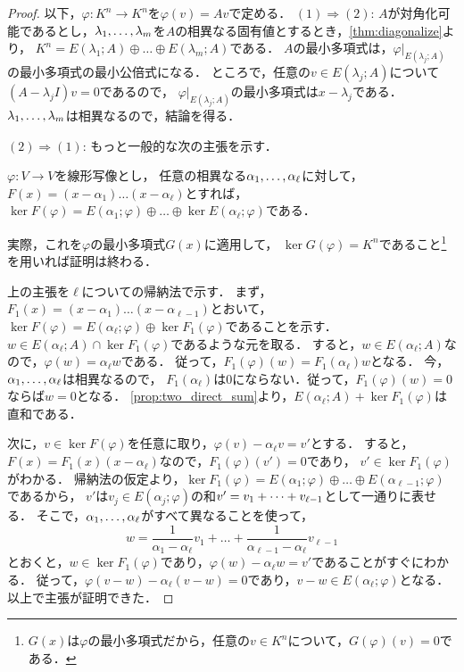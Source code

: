 \begin{proof}
 以下，$\varphi \colon K^n \to K^n$を$\varphi(v)=Av$で定める．
$(1) \Rightarrow (2)$:
$A$が対角化可能であるとし，$\idxdot{\lambda}{1}{m}$を$A$の相異なる固有値とするとき，\cref{thm:diagonalize}より，
$K^n = E(\lambda_1;A) \oplus \dots \oplus E(\lambda_m;A)$である．
$A$の最小多項式は，$\varphi|_{E(\lambda_j;A)}$の最小多項式の最小公倍式になる．
ところで，任意の$v \in E(\lambda_j;A)$について$(A-\lambda_j I)v = 0$であるので，
$\varphi|_{E(\lambda_j;A)}$の最小多項式は$x-\lambda_j$である．
$\idxdot{\lambda}{1}{m}$は相異なるので，結論を得る．

$(2) \Rightarrow (1)$:
もっと一般的な次の主張を示す．
\begin{claim}
    $\varphi\colon V \to V$を線形写像とし，
    任意の相異なる$\idxdot{\alpha}{1}{\ell}$に対して，
    $F(x)=(x-\alpha_1)\dots(x-\alpha_\ell)$とすれば，
    $\ker F(\varphi) = E(\alpha_1;\varphi) \oplus \dots \oplus \ker E(\alpha_\ell;\varphi)$である．
\end{claim}
実際，これを$\varphi$の最小多項式$G(x)$に適用して，
$\ker G(\varphi) = K^n$であること\footnote{$G(x)$は$\varphi$の最小多項式だから，任意の$v \in K^n$について，$G(\varphi)(v) = 0$である．}を用いれば証明は終わる．

上の主張を$\ell$についての帰納法で示す．
まず，$F_1(x)=(x-\alpha_1)\dots(x-\alpha_{\ell-1})$とおいて，
$\ker F(\varphi) = E(\alpha_\ell;\varphi) \oplus \ker F_1(\varphi)$であることを示す．
$w \in E(\alpha_\ell;A) \cap \ker F_1(\varphi)$であるような元を取る．
すると，$w \in E(\alpha_\ell;A)$なので，$\varphi(w)=\alpha_\ell w$である．
従って，$F_1(\varphi)(w)=F_1(\alpha_\ell)w$となる．
今，$\idxdot{\alpha}{1}{\ell}$は相異なるので，
$F_1(\alpha_\ell)$は0にならない．従って，$F_1(\varphi)(w)=0$ならば$w=0$となる．
\cref{prop:two_direct_sum}より，$E(\alpha_\ell;A) + \ker F_1(\varphi)$は直和である．

次に，$v \in \ker F(\varphi)$を任意に取り，$\varphi(v)-\alpha_\ell v = v'$とする．
すると，$F(x) = F_1(x)(x-\alpha_\ell)$なので，$F_1(\varphi)(v')=0$であり，
$v' \in \ker F_1(\varphi)$がわかる．
帰納法の仮定より，$\ker F_1(\varphi) = E(\alpha_1;\varphi) \oplus \dots \oplus E(\alpha_{\ell-1};\varphi)$であるから，
$v'$は$v_j \in E(\alpha_j;\varphi)$の和$v'=\idxsum{v}{1}{\ell-1}{+}$として一通りに表せる．
そこで，$\idxdot{\alpha}{1}{\ell}$がすべて異なることを使って，
\[
    w = \frac{1}{\alpha_1-\alpha_\ell} v_1 + \dots + \frac{1}{\alpha_{\ell-1}-\alpha_\ell} v_{\ell-1} 
\]
とおくと，$w \in \ker F_1(\varphi)$であり，$\varphi(w) - \alpha_\ell w = v'$であることがすぐにわかる．
従って，$\varphi(v-w) - \alpha_\ell (v-w) = 0$であり，$v-w \in E(\alpha_\ell;\varphi)$となる．以上で主張が証明できた．
\end{proof}
